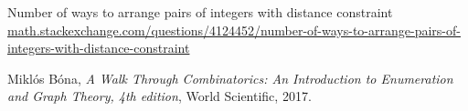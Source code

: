 \documentclass[10pt]{article}
\numberwithin{equation}{section}
\begin{document}
\begin{thebibliography}{100}

Number of ways to arrange pairs of integers with distance constraint
\href{https://math.stackexchange.com/questions/4124452/number-of-ways-to-arrange-pairs-of-integers-with-distance-constraint}{math.stackexchange.com/questions/4124452/number-of-ways-to-arrange-pairs-of-integers-with-distance-constraint}

 Mikl\'os B\'ona, {\it A Walk Through Combinatorics: An Introduction to Enumeration and Graph Theory, 4th edition}, World Scientific, 2017. 

\end{thebibliography}
%
\end{document}
